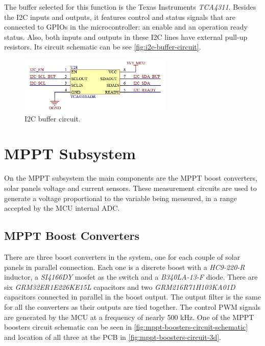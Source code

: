The buffer selected for this function is the Texas Instruments \textit{TCA4311}. Besides the I2C inputs and outputs, it features control and status signals that are connected to GPIOs in the microcontroller: an enable and an operation ready status. Also, both inputs and outputs in these I2C lines have external pull-up resistors. Its circuit schematic can be see \autoref{fig:i2c-buffer-circuit}.

\begin{figure}[!ht]
    \begin{center}
        \includegraphics[width=0.65\textwidth]{figures/i2c-buffer-circuit.png}
        \caption{I2C buffer circuit.}
        \label{fig:i2c-buffer-circuit}
    \end{center}
\end{figure}

\section{MPPT Subsystem}

On the MPPT subsystem the main components are the MPPT boost converters, solar panels voltage and current sensors. These measurement circuits are used to generate a voltage proportional to the variable being measured, in a range accepted by the MCU internal ADC.

\subsection{MPPT Boost Converters}

There are three boost converters in the system, one for each couple of solar panels in parallel connection. Each one is a discrete boost with a \textit{HC9-220-R} inductor, a \textit{SI4166DY} mosfet as the switch and a \textit{B340LA-13-F} diode. There are six \textit{GRM32ER1E226KE15L} capacitors and two \textit{GRM216R71H103KA01D} capacitors connected in parallel in the boost output. The output filter is the same for all the converters as their outputs are tied together. The control PWM signals are generated by the MCU at a frequency of nearly 500 kHz.
One of the MPPT boosters circuit schematic can be seen in \autoref{fig:mppt-boosters-circuit-schematic} and location of all three at the PCB in \autoref{fig:mppt-boosters-circuit-3d}.

